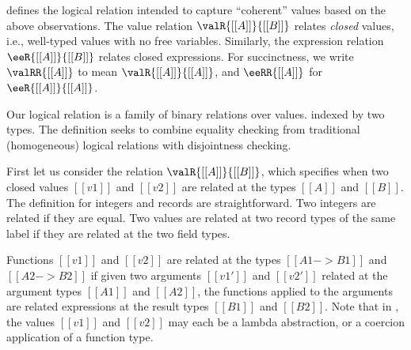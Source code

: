  defines the logical relation intended to capture
``coherent'' values based on the above observations. The value relation
$\valR{[[A]]}{[[B]]}$ relates \textit{closed} values, i.e., well-typed values
with no free variables. Similarly, the expression relation $\eeR{[[A]]}{[[B]]}$
relates closed expressions. For succinctness, we write $\valRR{[[A]]}$ to mean
$\valR{[[A]]}{[[A]]}$, and $\eeRR{[[A]]}$ for $\eeR{[[A]]}{[[A]]}$.


\begin{remark}
  Our logical relation is a family of binary relations over \tname values.
  indexed by two \namee types. The definition seeks to combine equality checking
  from traditional (homogeneous) logical relations with disjointness checking.
\end{remark}



First let us consider the relation $\valR{[[A]]}{[[B]]}$, which specifies when
two closed values $[[v1]]$ and $[[v2]]$ are related at the types $[[A]]$ and
$[[B]]$. The definition for integers and records are straightforward. Two
integers are related if they are equal. Two values are related at two
record types of the same label if they are related at the two field types.

Functions $[[v1]]$ and $[[v2]]$ are related at the types $[[A1 -> B1]]$ and
$[[A2 -> B2]]$ if given two arguments $[[v1']]$ and $[[v2']]$ related at the
argument types $[[A1]]$ and $[[A2]]$, the functions applied to the arguments are
related expressions at the result types $[[B1]]$ and $[[B2]]$. Note that in
\tname, the values $[[v1]]$ and $[[v2]]$ may each be a lambda abstraction, or a
coercion application of a function type.



